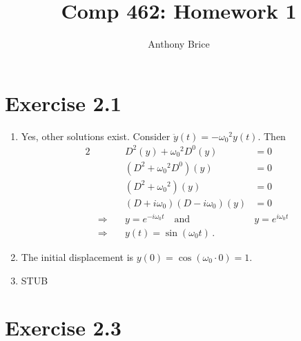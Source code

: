 \documentclass{abrice}
\title{Comp 462: Homework 1}
\author{Anthony Brice}
\begin{document}
\maketitle

\section{Exercise 2.1}
\begin{enumerate}[label=(\alph*)]
\item Yes, other solutions exist. Consider $\ddot{y}(t) = - {\omega_0}^2
  y(t)$. Then
  \begin{alignat*}{2}
    && D^2(y) + {\omega_0}^2 D^0(y) &= 0 \\
    && (D^2 + {\omega_0}^2 D^0)(y) &= 0 \\
    && (D^2 + {\omega_0}^2)(y) &= 0 \\
    && (D + i \omega_0)(D - i \omega_0)(y) &= 0 \\
    &\Rightarrow \quad & y = e^{-i \omega_0 t}\quad \textrm{and}\quad &y = e^{i
      \omega_0 t} \\
    &\Rightarrow \quad & y(t) = \sin(\omega_0 t)\, .
  \end{alignat*}
\item The initial displacement is $y(0) = \cos(\omega_0 \cdot 0) = 1$.
\item STUB
\end{enumerate}

\section{Exercise 2.3}
\end{document}
